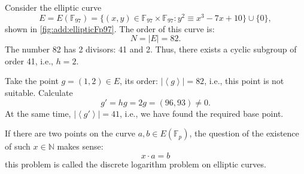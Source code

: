 


\begin{example}
\label{ex:add:elliptic:basepoint}
Consider the elliptic curve 
\[
E = E\left(\mathbb{F}_{97}\right) = 
\{(x,y) \in \mathbb{F}_{97} \times \mathbb{F}_{97}: y^2 \equiv x^3 -7 x + 10 \} \cup \{0\},
\] 
shown in \autoref{fig:add:ellipticFp97}. The order of this curve is:
\[
N = \left|E\right| = 82.
\]
The number 82 has 2 divisors: 41 and 2. Thus, there exists a cyclic subgroup of order 41, i.e., $h = 2$. 

Take the point $g = (1,2) \in E$, its order:
$\left|\left<g\right>\right| = 82$, i.e., this point is not suitable. 
Calculate 
\[
g' = h g = 2 g = (96,93) \ne 0.
\]
At the same time, $\left|\left<g'\right>\right| = 41$, i.e., we have found the required base point.
\end{example}

If there are two points on the curve $a, b \in E\left(\mathbb{F}_p\right)$,
the question of the existence of such $x \in \mathbb{N}$ makes sense:
\[
x \cdot a = b
\]
this problem is called the discrete logarithm problem on elliptic
curves. 

